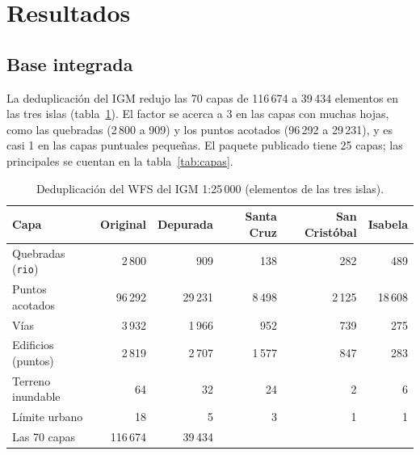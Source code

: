 \documentclass{sosg-informe}
\begin{document}
\section{Resultados}

\subsection{Base integrada}
La deduplicación del IGM redujo las 70 capas de 116\,674 a 39\,434 elementos en las tres islas (tabla~\ref{tab:igm}). El factor se acerca a 3 en las capas con muchas hojas, como las quebradas (2\,800 a 909) y los puntos acotados (96\,292 a 29\,231), y es casi 1 en las capas puntuales pequeñas. El paquete publicado tiene 25 capas; las principales se cuentan en la tabla~\ref{tab:capas}.

\begin{table}[ht]
  \centering\small
  \caption{Deduplicación del WFS del IGM 1:25\,000 (elementos de las tres islas).}
  \label{tab:igm}
  \begin{tabular}{lrrrrr}
    \toprule
    Capa & Original & Depurada & Santa Cruz & San Cristóbal & Isabela \\
    \midrule
    Quebradas (\texttt{rio}) & 2\,800 & 909 & 138 & 282 & 489 \\
    Puntos acotados & 96\,292 & 29\,231 & 8\,498 & 2\,125 & 18\,608 \\
    Vías & 3\,932 & 1\,966 & 952 & 739 & 275 \\
    Edificios (puntos) & 2\,819 & 2\,707 & 1\,577 & 847 & 283 \\
    Terreno inundable & 64 & 32 & 24 & 2 & 6 \\
    Límite urbano & 18 & 5 & 3 & 1 & 1 \\
    \midrule
    Las 70 capas & 116\,674 & 39\,434 & & & \\
    \bottomrule
  \end{tabular}
\end{table}
\end{document}
